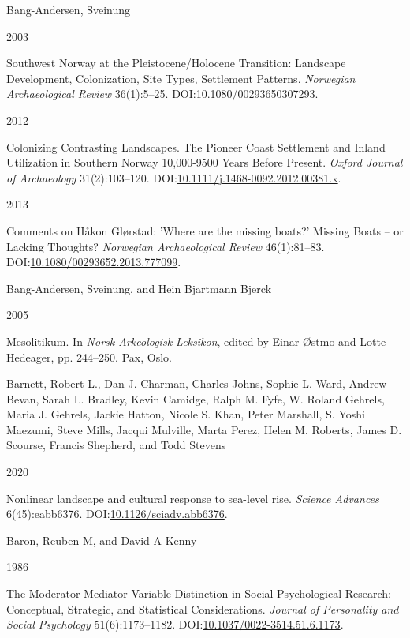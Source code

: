 \documentclass[
  12pt,
  a4paper,
  oneside]{book}
\newlength{\cslhangindent}
\newlength{\csllabelwidth}
\newlength{\cslentryspacingunit} %
\newenvironment{CSLReferences}[2] %
 {%
  \setlength{\parindent}{0pt}
  \ifodd #1
  \let\oldpar\par
  \def\par{\hangindent=\cslhangindent\oldpar}
  \fi
  \setlength{\parskip}{#2\cslentryspacingunit}
 }%
 {}
\newcommand{\CSLBlock}[1]{#1\hfill\break}
\newcommand{\CSLLeftMargin}[1]{\parbox[t]{\csllabelwidth}{#1}}
\newcommand{\CSLRightInline}[1]{\parbox[t]{\linewidth - \csllabelwidth}{#1}\break}
\begin{document}
\begin{CSLReferences}{0}{0}
\leavevmode{}%
\CSLBlock{Bang-Andersen, Sveinung}
\CSLLeftMargin{ 2003}%
\CSLRightInline{{Southwest Norway at the Pleistocene/Holocene Transition: Landscape Development, Colonization, Site Types, Settlement Patterns}. \emph{Norwegian Archaeological Review} 36(1):5--25. DOI:\href{https://doi.org/10.1080/00293650307293}{10.1080/00293650307293}.}

\leavevmode{}%
\CSLLeftMargin{ 2012 }%
\CSLRightInline{{Colonizing Contrasting Landscapes. The Pioneer Coast Settlement and Inland Utilization in Southern Norway 10,000-9500 Years Before Present}. \emph{Oxford Journal of Archaeology} 31(2):103--120. DOI:\href{https://doi.org/10.1111/j.1468-0092.2012.00381.x}{10.1111/j.1468-0092.2012.00381.x}.}

\leavevmode{}%
\CSLLeftMargin{ 2013 }%
\CSLRightInline{{Comments on Håkon Glørstad: 'Where are the missing boats?' Missing Boats -- or Lacking Thoughts?} \emph{Norwegian Archaeological Review} 46(1):81--83. DOI:\href{https://doi.org/10.1080/00293652.2013.777099}{10.1080/00293652.2013.777099}.}

\leavevmode{}%
\CSLBlock{Bang-Andersen, Sveinung, and Hein Bjartmann Bjerck}
\CSLLeftMargin{ 2005}%
\CSLRightInline{{Mesolitikum}. In \emph{{Norsk Arkeologisk Leksikon}}, edited by Einar Østmo and Lotte Hedeager, pp. 244--250. Pax, Oslo.}

\leavevmode{}%
\CSLBlock{Barnett, Robert L., Dan J. Charman, Charles Johns, Sophie L. Ward, Andrew Bevan, Sarah L. Bradley, Kevin Camidge, Ralph M. Fyfe, W. Roland Gehrels, Maria J. Gehrels, Jackie Hatton, Nicole S. Khan, Peter Marshall, S. Yoshi Maezumi, Steve Mills, Jacqui Mulville, Marta Perez, Helen M. Roberts, James D. Scourse, Francis Shepherd, and Todd Stevens}
\CSLLeftMargin{ 2020}%
\CSLRightInline{Nonlinear landscape and cultural response to sea-level rise. \emph{Science Advances} 6(45):eabb6376. DOI:\href{https://doi.org/10.1126/sciadv.abb6376}{10.1126/sciadv.abb6376}.}

\leavevmode{}%
\CSLBlock{Baron, Reuben M, and David A Kenny}
\CSLLeftMargin{ 1986}%
\CSLRightInline{{The Moderator-Mediator Variable Distinction in Social Psychological Research: Conceptual, Strategic, and Statistical Considerations}. \emph{Journal of Personality and Social Psychology} 51(6):1173--1182. DOI:\href{https://doi.org/10.1037/0022-3514.51.6.1173}{10.1037/0022-3514.51.6.1173}.}


\end{CSLReferences}
\end{document}
